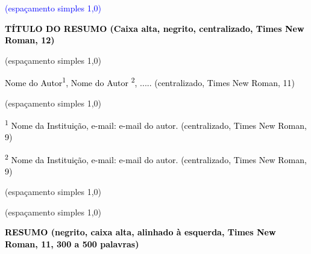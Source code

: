\documentclass[letterpaper]{report}
\title{}
\begin{document}
\clearpage\setcounter{page}{1}\pagestyle{Standard}
{\centering{}
\foreignlanguage{portuges}{\textcolor{blue}{(espaçamento simples 1,0)}}
\par}

{\centering{}
\foreignlanguage{portuges}{\textbf{\textcolor{black}{TÍTULO DO RESUMO (Caixa alta, negrito, centralizado, Times New Roman, 12)}}}
\par}

{\centering{}\color{blue}
(espaçamento simples 1,0)
\par}

{\centering{}
\foreignlanguage{portuges}{\textcolor{black}{Nome do Autor}}\foreignlanguage{portuges}{\textcolor{black}{\textsuperscript{1}}}\foreignlanguage{portuges}{\textcolor{black}{, Nome do Autor}}\foreignlanguage{portuges}{\textcolor{black}{\textsuperscript{ 2}}}\foreignlanguage{portuges}{\textcolor{black}{, ..... (centralizado, Times New Roman, 11)}}
\par}

{\centering{}\color{blue}
(espaçamento simples 1,0)
\par}

{\centering{}
\foreignlanguage{portuges}{\textcolor{black}{\textsuperscript{1}}}\foreignlanguage{portuges}{\textcolor{black}{ Nome da Instituição, e-mail: e-mail do autor. (centralizado, Times New Roman, 9)}}
\par}

{\centering{}
\foreignlanguage{portuges}{\textcolor{black}{\textsuperscript{2}}}\foreignlanguage{portuges}{\textcolor{black}{ Nome da Instituição, e-mail: e-mail do autor. (centralizado, Times New Roman, 9)}}
\par}

{\centering{}\color{blue}
(espaçamento simples 1,0)
\par}

{\centering{}\color{blue}
(espaçamento simples 1,0)
\par}

{
\foreignlanguage{portuges}{\textbf{\textcolor{black}{RESUMO (negrito, caixa alta, alinhado à esquerda, Times New Roman, 11, 300 a 500 palavras)}}}}
\end{document}
